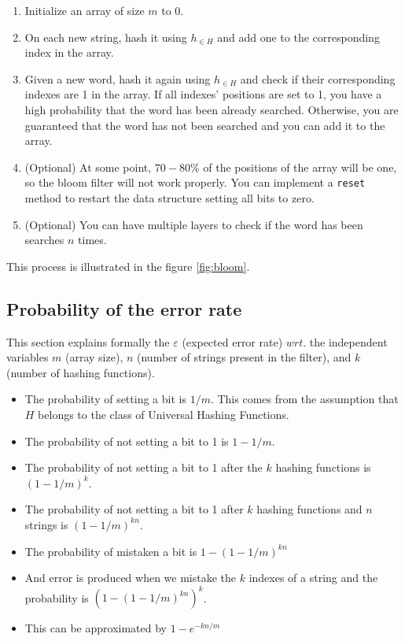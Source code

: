\documentclass[12pt, a4paper]{article} %
\newcommand{\code}[1]{\texttt{#1}} %
\begin{document}
\begin{enumerate}
  \item Initialize an array of size $m$ to 0.
  \item On each new string, hash it using $h_{\in H}$ and add one to the corresponding index in the array.
  \item Given a new word, hash it again using $h_{\in H}$ and check if their corresponding indexes are 1 in the array. If all indexes' positions are set to 1, you have a high probability that the word has been already searched. Otherwise, you are guaranteed that the word has not been searched and you can add it to the array.
  \item (Optional) At some point, $70-80\%$ of the positions of the array will be one, so the bloom filter will not work properly. You can implement a \code{reset} method to restart the data structure setting all bits to zero.
  \item (Optional) You can have multiple layers to check if the word has been searches $n$ times.
\end{enumerate}

This process is illustrated in the figure \ref{fig:bloom}.

\subsection{Probability of the error rate}\label{s:probability}

This section explains formally the $\varepsilon$ (expected error rate) $wrt.$ the independent variables $m$ (array size), $n$ (number of strings present in the filter), and $k$ (number of hashing functions).

\begin{itemize}
  \item The probability of setting a bit is $1/m$. This comes from the assumption that $H$ belongs to the class of Universal Hashing Functions.
  \item The probability of not setting a bit to 1 is $1 - 1/m$.
  \item The probability of not setting a bit to 1 after the $k$ hashing functions is $(1 - 1/m)^k$.
  \item The probability of not setting a bit to 1 after $k$ hashing functions and $n$ strings is $(1 - 1/m)^{kn}$.
  \item The probability of mistaken a bit is $1 - (1 - 1/m)^{kn}$
  \item And error is produced when we mistake the $k$ indexes of a string and the probability is $(1 - (1 - 1/m)^{kn})^k$.
  \item This can be approximated by $1 - e^{-kn/m}$
\end{itemize}
\end{document}
